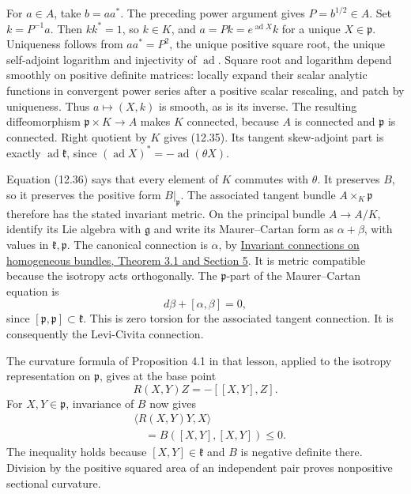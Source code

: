 \documentclass[
  11pt,
]{article}
\begin{document}
For \(a\in A\), take \(b=aa^*\). The preceding power argument gives
\(P=b^{1/2}\in A\). Set \(k=P^{-1}a\). Then \(kk^*=1\), so \(k\in K\),
and \(a=Pk=e^{\operatorname{ad}X}k\) for a unique \(X\in\mathfrak p\).
Uniqueness follows from \(aa^*=P^2\), the unique positive square root,
the unique self-adjoint logarithm and injectivity of
\(\operatorname{ad}\). Square root and logarithm depend smoothly on
positive definite matrices: locally expand their scalar analytic
functions in convergent power series after a positive scalar rescaling,
and patch by uniqueness. Thus \(a\mapsto(X,k)\) is smooth, as is its
inverse. The resulting diffeomorphism \(\mathfrak p\times K\to A\) makes
\(K\) connected, because \(A\) is connected and \(\mathfrak p\) is
connected. Right quotient by \(K\) gives (12.35). Its tangent
skew-adjoint part is exactly \(\operatorname{ad}\mathfrak k\), since
\((\operatorname{ad}X)^*=-\operatorname{ad}(\theta X)\).

Equation (12.36) says that every element of \(K\) commutes with
\(\theta\). It preserves \(B\), so it preserves the positive form
\(B|_{\mathfrak p}\). The associated tangent bundle
\(A\times_K\mathfrak p\) therefore has the stated invariant metric. On
the principal bundle \(A\to A/K\), identify its Lie algebra with
\(\mathfrak g\) and write its Maurer--Cartan form as \(\alpha+\beta\),
with values in \(\mathfrak k,\mathfrak p\). The canonical connection is
\(\alpha\), by
\href{https://kokunoyumeto.github.io/open-math-courses/courses/DG-FND/invariant-connections-on-homogeneous-bundles.html}{Invariant
connections on homogeneous bundles, Theorem 3.1 and Section 5}. It is
metric compatible because the isotropy acts orthogonally. The
\(\mathfrak p\)-part of the Maurer--Cartan equation is \[
d\beta+[\alpha,\beta]=0,
\tag{12.37}
\] since \([\mathfrak p,\mathfrak p]\subset\mathfrak k\). This is zero
torsion for the associated tangent connection. It is consequently the
Levi-Civita connection.

The curvature formula of Proposition 4.1 in that lesson, applied to the
isotropy representation on \(\mathfrak p\), gives at the base point \[
R(X,Y)Z=-[[X,Y],Z].
\tag{12.38}
\] For \(X,Y\in\mathfrak p\), invariance of \(B\) now gives \[
\begin{aligned}
&\langle R(X,Y)Y,X\rangle\\
&\quad=B([X,Y],[X,Y])\leq0.
\end{aligned}
\tag{12.39}
\] The inequality holds because \([X,Y]\in\mathfrak k\) and \(B\) is
negative definite there. Division by the positive squared area of an
independent pair proves nonpositive sectional curvature.
\end{document}
